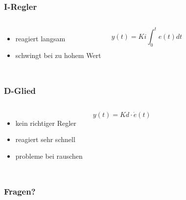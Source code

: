 \documentclass[12pt,a4paper, ngerman]{beamer}
\begin{document}
\begin{frame}
\frametitle{I-Regler}
\begin{columns}
\begin{itemize}
\item reagiert langsam
\item schwingt bei zu hohem Wert
\end{itemize}
\begin{equation*}
y(t)=Ki\int_{0}^{t}e(t)dt
\end{equation*}
\end{columns}
\end{frame}

\begin{frame}
\frametitle{D-Glied}
\begin{columns}
\begin{itemize}
\item kein richtiger Regler
\item reagiert sehr schnell
\item probleme bei rauschen
\end{itemize}
\begin{equation*}
y(t)=Kd\cdot \dot{e}(t)
\end{equation*}
\end{columns}
\end{frame}


\begin{frame}
\frametitle{Fragen?}
\begin{center}
\color{blue}
\end{center}
\end{frame}
\end{document}
